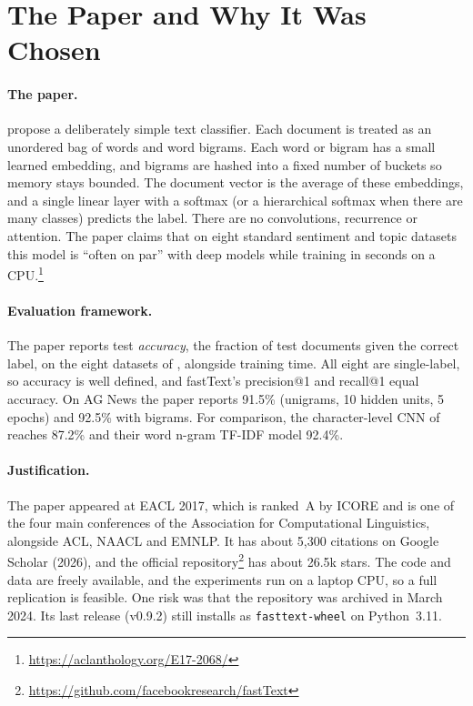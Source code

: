 \documentclass[11pt]{article}
\begin{document}
\section{The Paper and Why It Was Chosen}

\paragraph{The paper.} \citet{joulin-etal-2017-bag} propose a deliberately simple text
classifier. Each document is treated as an unordered bag of words and word bigrams. Each
word or bigram has a small learned embedding, and bigrams are hashed into a fixed number of
buckets so memory stays bounded. The document vector is the average of these embeddings,
and a single linear layer with a softmax (or a hierarchical softmax when there are many
classes) predicts the label. There are no convolutions, recurrence or attention. The paper
claims that on eight standard sentiment and topic datasets this model is ``often on par''
with deep models while training in seconds on a CPU.\footnote{%
\url{https://aclanthology.org/E17-2068/}}

\paragraph{Evaluation framework.} The paper reports test \emph{accuracy}, the fraction of
test documents given the correct label, on the eight datasets of \citet{zhang2015character},
alongside training time. All eight are single-label, so accuracy is well defined, and
fastText's precision@1 and recall@1 equal accuracy. On AG News the paper reports
91.5\% (unigrams, 10 hidden units, 5 epochs) and 92.5\% with bigrams. For comparison, the
character-level CNN of \citet{zhang2015character} reaches 87.2\% and their word n-gram TF-IDF
model 92.4\%.

\paragraph{Justification.} The paper appeared at EACL 2017, which is ranked~A by ICORE
\citep{icore2026} and is one of the four main conferences of the Association for
Computational Linguistics, alongside ACL, NAACL and EMNLP.
It has about 5,300 citations on Google Scholar (2026), and the official
repository\footnote{\url{https://github.com/facebookresearch/fastText}} has about 26.5k
stars. The code and data are freely available, and the experiments run on a laptop CPU,
so a full replication is feasible. One risk was that the repository was archived in March
2024. Its last release (v0.9.2) still installs as \texttt{fasttext-wheel} on Python~3.11.
\end{document}
